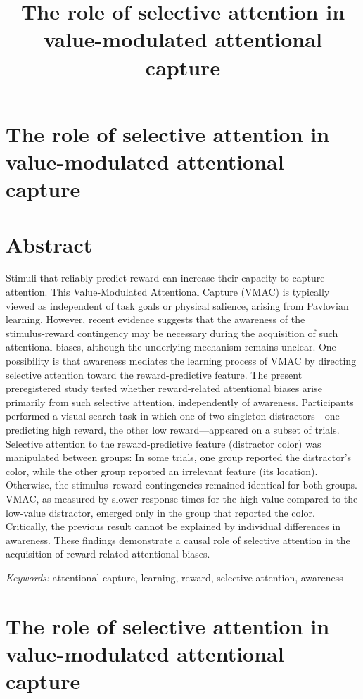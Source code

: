 \documentclass[
  man,
  floatsintext,
  longtable,
  nolmodern,
  notxfonts,
  notimes,
  mask,
  colorlinks=true,linkcolor=blue,citecolor=blue,urlcolor=blue]{apa7}
\title{The role of selective attention in value-modulated attentional
capture}
\begin{document}
\section[Introduction]{The role of selective attention in
value-modulated attentional capture}

\setcounter{secnumdepth}{-\maxdimen} %

\setlength\LTleft{0pt}


\section*{Abstract}

Stimuli that reliably predict reward can increase their capacity to
capture attention. This Value‑Modulated Attentional Capture (VMAC) is
typically viewed as independent of task goals or physical salience,
arising from Pavlovian learning. However, recent evidence suggests that
the awareness of the stimulus‑reward contingency may be necessary during
the acquisition of such attentional biases, although the underlying
mechanism remains unclear. One possibility is that awareness mediates
the learning process of VMAC by directing selective attention toward the
reward-predictive feature. The present preregistered study tested
whether reward‑related attentional biases arise primarily from such
selective attention, independently of awareness. Participants performed
a visual search task in which one of two singleton distractors---one
predicting high reward, the other low reward---appeared on a subset of
trials. Selective attention to the reward‑predictive feature (distractor
color) was manipulated between groups: In some trials, one group
reported the distractor's color, while the other group reported an
irrelevant feature (its location). Otherwise, the stimulus--reward
contingencies remained identical for both groups. VMAC, as measured by
slower response times for the high‑value compared to the low‑value
distractor, emerged only in the group that reported the color.
Critically, the previous result cannot be explained by individual
differences in awareness. These findings demonstrate a causal role of
selective attention in the acquisition of reward-related attentional
biases.

\bigskip

\noindent\textit{Keywords:} attentional capture, learning, reward,
selective attention, awareness

\newpage

\section{The role of selective attention in value-modulated attentional
capture}\label{the-role-of-selective-attention-in-value-modulated-attentional-capture}
\end{document}
